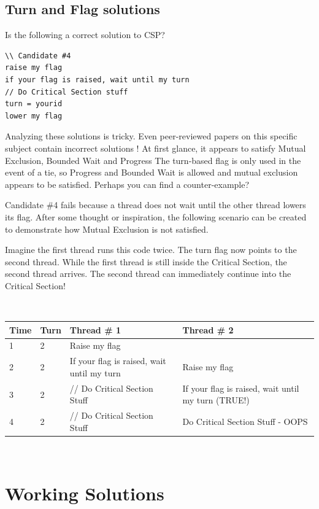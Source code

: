 \subsection{Turn and Flag solutions}

Is the following a correct solution to CSP?

\begin{lstlisting}
\\ Candidate #4
raise my flag
if your flag is raised, wait until my turn
// Do Critical Section stuff
turn = yourid
lower my flag
\end{lstlisting}

Analyzing these solutions is tricky.
Even peer-reviewed papers on this specific subject contain incorrect solutions \cite{Hyman:1966:CPC:365153.365167}!
At first glance, it appears to satisfy Mutual Exclusion, Bounded Wait and Progress
The turn-based flag is only used in the event of a tie, so Progress and Bounded Wait is allowed and mutual exclusion appears to be satisfied.
Perhaps you can find a counter-example?

Candidate \#4 fails because a thread does not wait until the other thread lowers its flag.
After some thought or inspiration, the following scenario can be created to demonstrate how Mutual Exclusion is not satisfied.

Imagine the first thread runs this code twice.
The turn flag now points to the second thread.
While the first thread is still inside the Critical Section, the second thread arrives.
The second thread can immediately continue into the Critical Section!

\\
\begin{center}
\begin{tabular}{|l|l|l|l|}
Time & Turn & Thread \# 1 & Thread \# 2 \\ \hline
1 & 2 & Raise my flag & \\
2 & 2 & If your flag is raised, wait until my turn & Raise my flag \\
3 & 2 & // Do Critical Section Stuff & If your flag is raised, wait until my turn (TRUE!) \\
4 & 2 & // Do Critical Section Stuff & Do Critical Section Stuff - OOPS \\
\end{tabular}
\end{center}
\\

\section{Working Solutions}

